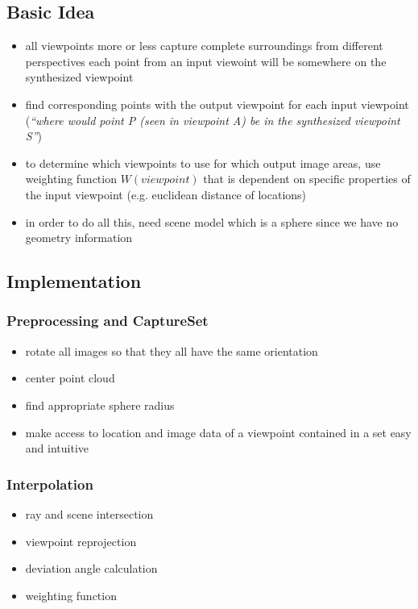 \subsection{Basic Idea}



\begin{itemize}
    \item all viewpoints more or less capture complete surroundings from different perspectives \ar each point from an input viewoint will be somewhere on the synthesized viewpoint
    \item find corresponding points with the output viewpoint for each input viewpoint (\emph{``where would point P (seen in viewpoint A) be in the synthesized viewpoint S''})
    \item to determine which viewpoints to use for which output image areas, use weighting function $W(viewpoint)$ that is dependent on specific properties of the input viewpoint (e.g. euclidean distance of locations)
    \item in order to do all this, need scene model which is a sphere since we have no geometry information
\end{itemize}

\subsection{Implementation}

\subsubsection{Preprocessing and CaptureSet}
\begin{itemize}
  \item rotate all images so that they all have the same orientation
  \item center point cloud
  \item find appropriate sphere radius
  \item make access to location and image data of a viewpoint contained in a set easy and intuitive
\end{itemize}

\subsubsection{Interpolation}
\begin{itemize}
  \item ray and scene intersection
  \item viewpoint reprojection
  \item deviation angle calculation
  \item weighting function
\end{itemize}

